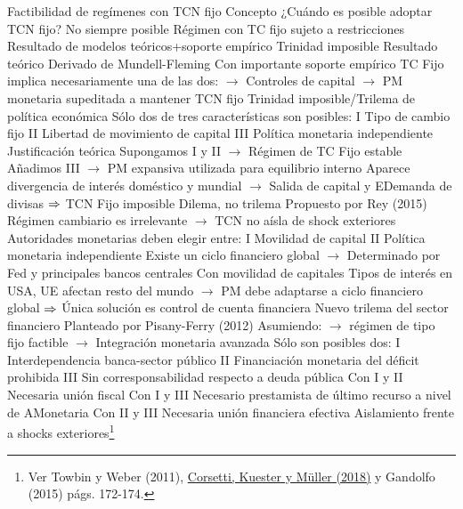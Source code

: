 \documentclass{nuevotema}
\begin{document}
\begin{esquemal}
		\2 Factibilidad de regímenes con TCN fijo
			\3 Concepto
				\4 ¿Cuándo es posible adoptar TCN fijo?
				\4[] No siempre posible
				\4[] Régimen con TC fijo sujeto a restricciones
				\4[] Resultado de modelos teóricos+soporte empírico
			\3 Trinidad imposible
				\4 Resultado teórico
				\4[] Derivado de Mundell-Fleming
				\4[] Con importante soporte empírico
				\4 TC Fijo implica necesariamente una de las dos:
				\4[] $\to$ Controles de capital
				\4[] $\to$ PM monetaria supeditada a mantener TCN fijo
				\4[$\then$] Trinidad imposible/Trilema de política económica
				\4[] Sólo dos de tres características son posibles:
				\4[] \textsc{I} Tipo de cambio fijo
				\4[] \textsc{II} Libertad de movimiento de capital
				\4[] \textsc{III} Política monetaria independiente
				\4 Justificación teórica
				\4[] Supongamos I y II
				\4[] $\to$ Régimen de TC Fijo estable
				\4[] Añadimos III
				\4[] $\to$ PM expansiva utilizada para equilibrio interno
				\4[] Aparece divergencia de interés doméstico y mundial
				\4[] $\to$ Salida de capital y EDemanda de divisas
				\4[] $\then$ TCN Fijo imposible
			\3 Dilema, no trilema
				\4 Propuesto por Rey (2015)
				\4[] Régimen cambiario es irrelevante
				\4[] $\to$ TCN no aísla de shock exteriores
				\4 Autoridades monetarias deben elegir entre:
				\4[] \textsc{I} Movilidad de capital
				\4[] \textsc{II} Política monetaria independiente
				\4 Existe un ciclo financiero global
				\4[] $\to$ Determinado por Fed y principales bancos centrales
				\4 Con movilidad de capitales
				\4[] Tipos de interés en USA, UE afectan resto del mundo
				\4[] $\to$ PM debe adaptarse a ciclo financiero global
				\4[] $\then$ Única solución es control de cuenta financiera
			\3 Nuevo trilema del sector financiero
				\4 Planteado por Pisany-Ferry (2012)
				\4 Asumiendo:
				\4[] $\to$ régimen de tipo fijo factible
				\4[] $\to$ Integración monetaria avanzada
				\4[] Sólo son posibles dos:
				\4[] \textsc{I} Interdependencia banca-sector público
				\4[] \textsc{II} Financiación monetaria del déficit prohibida
				\4[] \textsc{III} Sin corresponsabilidad respecto a deuda pública
				\4 Con I y II
				\4[] Necesaria unión fiscal
				\4 Con I y III
				\4[] Necesario prestamista de último recurso a nivel de AMonetaria
				\4 Con II y III
				\4[] Necesaria unión financiera efectiva
		\2 Aislamiento frente a shocks exteriores\footnote{Ver Towbin y Weber (2011), \href{https://www.riksbank.se/globalassets/media/rapporter/pov/artiklar/engelska/2018/180326/20181-the-case-for-flexible-exchange-rates-after-the-great-recession.pdf}{Corsetti, Kuester y Müller (2018)} y Gandolfo (2015) págs. 172-174. }

\end{esquemal}
\end{document}
